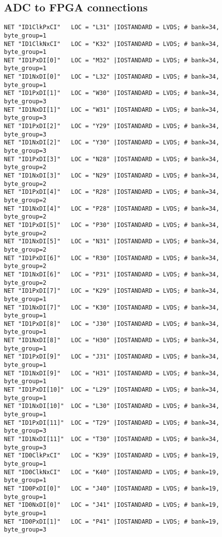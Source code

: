 \begin{appendix}
  \chapter{ADC to FPGA connections}
\label{sec:app_adc_fpga_con}
\begin{verbatim}
NET "ID1ClkPxCI"   LOC = "L31" |IOSTANDARD = LVDS; # bank=34, byte_group=1
NET "ID1ClkNxCI"   LOC = "K32" |IOSTANDARD = LVDS; # bank=34, byte_group=1
NET "ID1PxDI[0]"   LOC = "M32" |IOSTANDARD = LVDS; # bank=34, byte_group=1
NET "ID1NxDI[0]"   LOC = "L32" |IOSTANDARD = LVDS; # bank=34, byte_group=1
NET "ID1PxDI[1]"   LOC = "W30" |IOSTANDARD = LVDS; # bank=34, byte_group=3
NET "ID1NxDI[1]"   LOC = "W31" |IOSTANDARD = LVDS; # bank=34, byte_group=3
NET "ID1PxDI[2]"   LOC = "Y29" |IOSTANDARD = LVDS; # bank=34, byte_group=3
NET "ID1NxDI[2]"   LOC = "Y30" |IOSTANDARD = LVDS; # bank=34, byte_group=3
NET "ID1PxDI[3]"   LOC = "N28" |IOSTANDARD = LVDS; # bank=34, byte_group=2
NET "ID1NxDI[3]"   LOC = "N29" |IOSTANDARD = LVDS; # bank=34, byte_group=2
NET "ID1PxDI[4]"   LOC = "R28" |IOSTANDARD = LVDS; # bank=34, byte_group=2
NET "ID1NxDI[4]"   LOC = "P28" |IOSTANDARD = LVDS; # bank=34, byte_group=2
NET "ID1PxDI[5]"   LOC = "P30" |IOSTANDARD = LVDS; # bank=34, byte_group=2
NET "ID1NxDI[5]"   LOC = "N31" |IOSTANDARD = LVDS; # bank=34, byte_group=2
NET "ID1PxDI[6]"   LOC = "R30" |IOSTANDARD = LVDS; # bank=34, byte_group=2
NET "ID1NxDI[6]"   LOC = "P31" |IOSTANDARD = LVDS; # bank=34, byte_group=2
NET "ID1PxDI[7]"   LOC = "K29" |IOSTANDARD = LVDS; # bank=34, byte_group=1
NET "ID1NxDI[7]"   LOC = "K30" |IOSTANDARD = LVDS; # bank=34, byte_group=1
NET "ID1PxDI[8]"   LOC = "J30" |IOSTANDARD = LVDS; # bank=34, byte_group=1
NET "ID1NxDI[8]"   LOC = "H30" |IOSTANDARD = LVDS; # bank=34, byte_group=1
NET "ID1PxDI[9]"   LOC = "J31" |IOSTANDARD = LVDS; # bank=34, byte_group=1
NET "ID1NxDI[9]"   LOC = "H31" |IOSTANDARD = LVDS; # bank=34, byte_group=1
NET "ID1PxDI[10]"  LOC = "L29" |IOSTANDARD = LVDS; # bank=34, byte_group=1
NET "ID1NxDI[10]"  LOC = "L30" |IOSTANDARD = LVDS; # bank=34, byte_group=1
NET "ID1PxDI[11]"  LOC = "T29" |IOSTANDARD = LVDS; # bank=34, byte_group=3
NET "ID1NxDI[11]"  LOC = "T30" |IOSTANDARD = LVDS; # bank=34, byte_group=3
NET "ID0ClkPxCI"   LOC = "K39" |IOSTANDARD = LVDS; # bank=19, byte_group=1
NET "ID0ClkNxCI"   LOC = "K40" |IOSTANDARD = LVDS; # bank=19, byte_group=1
NET "ID0PxDI[0]"   LOC = "J40" |IOSTANDARD = LVDS; # bank=19, byte_group=1
NET "ID0NxDI[0]"   LOC = "J41" |IOSTANDARD = LVDS; # bank=19, byte_group=1
NET "ID0PxDI[1]"   LOC = "P41" |IOSTANDARD = LVDS; # bank=19, byte_group=3

\end{verbatim}
\end{appendix}
